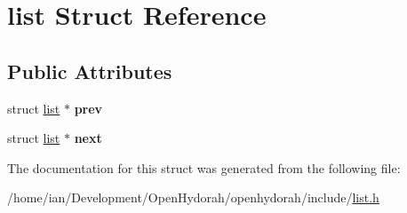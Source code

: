 \hypertarget{structlist}{\section{list Struct Reference}
\label{structlist}
}
\subsection*{Public Attributes}
\begin{DoxyCompactItemize}
\item 
\hypertarget{structlist_a73a574e77e33196672eccba15cd1b9ec}{struct \hyperlink{structlist}{list} $\ast$ {\bfseries prev}}\label{structlist_a73a574e77e33196672eccba15cd1b9ec}

\item 
\hypertarget{structlist_a1900fe79e875e2838625b2eb60837f8f}{struct \hyperlink{structlist}{list} $\ast$ {\bfseries next}}\label{structlist_a1900fe79e875e2838625b2eb60837f8f}

\end{DoxyCompactItemize}


The documentation for this struct was generated from the following file\-:\begin{DoxyCompactItemize}
\item 
/home/ian/\-Development/\-Open\-Hydorah/openhydorah/include/\hyperlink{list_8h}{list.\-h}\end{DoxyCompactItemize}
